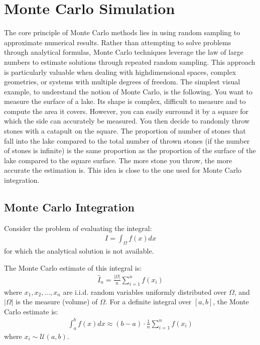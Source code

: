 \documentclass[letterpaper,10pt,english]{jupyterBook}
\begin{document}
\section{Monte Carlo Simulation}
\label{\detokenize{01:monte-carlo-simulation}}
\sphinxAtStartPar
The core principle of Monte Carlo methods lies in using random sampling to approximate numerical results. Rather than attempting to solve problems through analytical formulas, Monte Carlo techniques leverage the law of large numbers to estimate solutions through repeated random sampling. This approach is particularly valuable when dealing with high\sphinxhyphen{}dimensional spaces, complex geometries, or systems with multiple degrees of freedom. The simplest visual example, to understand the notion of Monte Carlo, is the following. You want to measure the surface of a lake. Its shape is complex, difficult to measure and to compute the area it covers. However, you can easily surround it by a square for which the side can accurately be measured. You then decide to randomly throw stones with a catapult on the square. The proportion of number of stones that fall into the lake compared to the total number of thrown stones (if the number of stones is infinite) is the same proportion as the proportion of the surface of the lake compared to the square surface. The more stone you throw, the more accurate the estimation is. This idea is close to the one used for Monte Carlo integration.


\subsection{Monte Carlo Integration}
\label{\detokenize{01:monte-carlo-integration}}
\sphinxAtStartPar
Consider the problem of evaluating the integral:
\begin{equation*}
\begin{split}
    I = \int_{\Omega} f(x) dx
\end{split}
\end{equation*}
\sphinxAtStartPar
for which the analytical solution is not available.

\sphinxAtStartPar
The Monte Carlo estimate of this integral is:
\begin{equation*}
\begin{split}
    \hat{I}_n = \frac{|\Omega|}{n} \sum_{i=1}^{n} f(x_i)
\end{split}
\end{equation*}
\sphinxAtStartPar
where \(x_1, x_2, \dots, x_n\) are i.i.d. random variables uniformly distributed over \(\Omega\), and \(|\Omega|\) is the measure (volume) of \(\Omega\).
For a definite integral over \([a, b]\), the Monte Carlo estimate is:
\begin{equation*}
\begin{split}
    \int_{a}^{b} f(x) dx \approx (b - a) \cdot \frac{1}{n} \sum_{i=1}^{n} f(x_i)
\end{split}
\end{equation*}
\sphinxAtStartPar
where \(x_i \sim \mathcal{U}(a, b)\).
\end{document}
